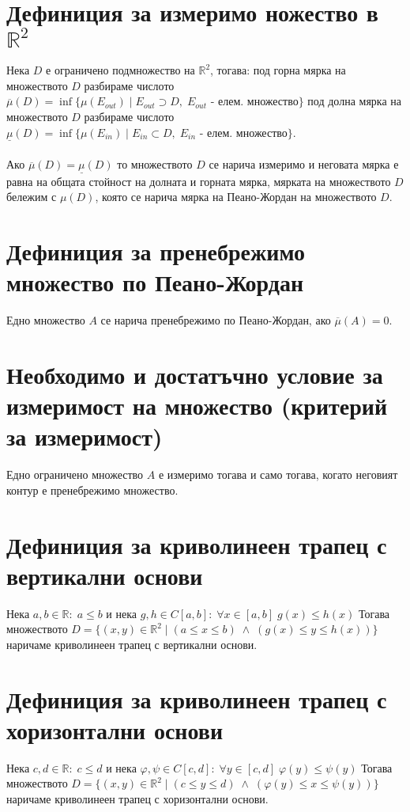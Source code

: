 \documentclass[14pt]{extarticle}
\newcommand{\R}{\mathbb{R}}
\begin{document}
\section*{Дефиниция за измеримо ножество в \(\R^2\)}
Нека \(D\) е ограничено подмножество на \(\R^2\), тогава:
под горна мярка на множеството \(D\) разбираме числото \(\overline{\mu}(D) = \inf\{\mu(E_{out}) \; | \; E_{out} \supset D, \; E_{out} \text{ - елем. множество} \}\)
под долна мярка на множеството \(D\) разбираме числото \\
\(\underline{\mu}(D) = \inf\{\mu(E_{in}) \; | \; E_{in} \subset D, \; E_{in} \text{ - елем. множество} \}\). \\\\
Ако \(\overline{\mu}(D) = \underline{\mu}(D)\) то множеството \(D\) се нарича измеримо и неговата мярка е равна на общата стойност на долната и горната мярка,
мярката на множеството \(D\) бележим с \(\mu(D)\), която се нарича мярка на Пеано-Жордан на множеството \(D\).
\section*{Дефиниция за пренебрежимо множество по Пеано-Жордан}
Едно множество \(A\) се нарича пренебрежимо по Пеано-Жордан, ако \(\overline{\mu}(A) = 0\).
\section*{Необходимо и достатъчно условие за измеримост на множество (критерий за измеримост)}
Едно ограничено множество \(A\) е измеримо тогава и само тогава, когато неговият контур е пренебрежимо множество.
\section*{Дефиниция за криволинеен трапец с вертикални основи}
Нека \(a, b \in \R : \; a \leq b \) и нека \(g, h \in C[a, b] : \; \forall x \in [a, b] \; g(x) \leq h(x)\)
Тогава множеството \(D = \{(x, y) \in \R^2 \; | \; (a \leq x \leq b) \; \land \; (g(x) \leq y \leq h(x)) \}\) наричаме криволинеен трапец с вертикални основи.
\section*{Дефиниция за криволинеен трапец с хоризонтални основи}
Нека \(c, d \in \R : \; c \leq d \) и нека \(\varphi, \psi \in C[c, d] : \; \forall y \in [c, d] \; \varphi(y) \leq \psi(y)\)
Тогава множеството \(D = \{(x, y) \in \R^2 \; | \; (c \leq y \leq d) \; \land \; (\varphi(y) \leq x \leq \psi(y)) \}\) наричаме криволинеен трапец с хоризонтални основи.
\end{document}
